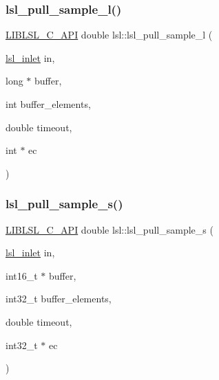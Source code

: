 \mbox{\label{namespacelsl_a7572c63f7c2569ddffb3ac2d8c16bd1e}} 
\subsubsection{\texorpdfstring{lsl\+\_\+pull\+\_\+sample\+\_\+l()}{lsl\_pull\_sample\_l()}}
{\footnotesize\ttfamily \hyperlink{lsl__cpp_8h_aafd0ef1813e8be84a1420c4f1df64615}{L\+I\+B\+L\+S\+L\+\_\+\+C\+\_\+\+A\+PI} double lsl\+::lsl\+\_\+pull\+\_\+sample\+\_\+l (\begin{DoxyParamCaption}\item[{\hyperlink{namespacelsl_a884a3363cfcba75d7ce8f00c1c4c54f1}{lsl\+\_\+inlet}}]{in,  }\item[{long $\ast$}]{buffer,  }\item[{int}]{buffer\+\_\+elements,  }\item[{double}]{timeout,  }\item[{int $\ast$}]{ec }\end{DoxyParamCaption})}

\mbox{\label{namespacelsl_a9c1676b5e509980eeb5065a2c84144c4}} 
\subsubsection{\texorpdfstring{lsl\+\_\+pull\+\_\+sample\+\_\+s()}{lsl\_pull\_sample\_s()}}
{\footnotesize\ttfamily \hyperlink{lsl__cpp_8h_aafd0ef1813e8be84a1420c4f1df64615}{L\+I\+B\+L\+S\+L\+\_\+\+C\+\_\+\+A\+PI} double lsl\+::lsl\+\_\+pull\+\_\+sample\+\_\+s (\begin{DoxyParamCaption}\item[{\hyperlink{namespacelsl_a884a3363cfcba75d7ce8f00c1c4c54f1}{lsl\+\_\+inlet}}]{in,  }\item[{int16\+\_\+t $\ast$}]{buffer,  }\item[{int32\+\_\+t}]{buffer\+\_\+elements,  }\item[{double}]{timeout,  }\item[{int32\+\_\+t $\ast$}]{ec }\end{DoxyParamCaption})}


